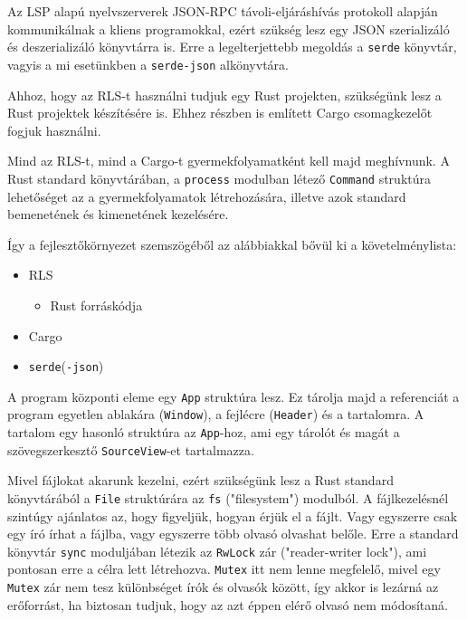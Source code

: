 Az LSP alapú nyelvszerverek JSON-RPC\cite{json-rpc} távoli-eljáráshívás protokoll alapján kommunikálnak
a kliens programokkal, ezért szükség lesz egy JSON szerializáló és deszerializáló könyvtárra is.
Erre a legelterjettebb megoldás a \texttt{serde} könyvtár, vagyis a mi esetünkben a \texttt{serde-json} alkönyvtára.

Ahhoz, hogy az RLS-t használni tudjuk egy Rust projekten, szükségünk lesz a Rust projektek készítésére is.
Ehhez  részben is említett Cargo csomagkezelőt fogjuk használni.

Mind az RLS-t, mind a Cargo-t gyermekfolyamatként kell majd meghívnunk.
A Rust standard könyvtárában, a \texttt{process} modulban létező \texttt{Command} struktúra
lehetőséget az a gyermekfolyamatok létrehozására, illetve azok standard bemenetének és kimenetének kezelésére.

Így a fejlesztőkörnyezet szemszögéből az alábbiakkal bővül ki a követelménylista:

\begin{itemize}
	\item RLS
	\begin{itemize}
		\item Rust forráskódja
	\end{itemize}
	\item Cargo
	\item \texttt{serde}(\texttt{-json})
\end{itemize}


A program központi eleme egy \texttt{App} struktúra lesz. 
Ez tárolja majd a referenciát a program egyetlen ablakára (\texttt{Window}), a fejlécre (\texttt{Header})
és a tartalomra.
A tartalom egy hasonló struktúra az \texttt{App}-hoz, ami egy tárolót és magát a szövegszerkesztő \texttt{SourceView}-et tartalmazza.

Mivel fájlokat akarunk kezelni, ezért szükségünk lesz a Rust standard könyvtárából a \texttt{File} struktúrára
az \texttt{fs} ("filesystem") modulból.
A fájlkezelésnél szintúgy ajánlatos az, hogy figyeljük, hogyan érjük el a fájlt.
Vagy egyszerre csak egy író írhat a fájlba, vagy egyszerre több olvasó olvashat belőle.
Erre a standard könyvtár \texttt{sync} moduljában létezik az \texttt{RwLock} zár ("reader-writer lock"),
ami pontosan erre a célra lett létrehozva.
\texttt{Mutex} itt nem lenne megfelelő, mivel egy \texttt{Mutex} zár nem tesz különbséget írók és olvasók között,
így akkor is lezárná az erőforrást, ha biztosan tudjuk, hogy az azt éppen elérő olvasó nem módosítaná.

